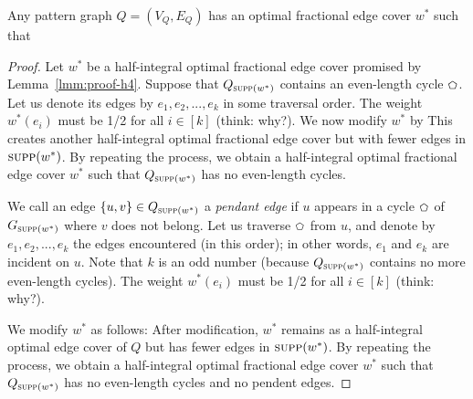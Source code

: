 \begin{lemma} \label{lmm:proof-h5}
   Any pattern graph $Q = (V_Q, E_Q)$ has an optimal fractional edge cover $w^*$ such that
\end{lemma}

\begin{proof}
    Let $w^*$ be a half-integral optimal fractional edge cover promised by Lemma~\ref{lmm:proof-h4}. Suppose that $Q_{\textsc{supp}(w^*)}$ contains an even-length cycle $\mycycle$. Let us denote its edges by $e_1, e_2, ..., e_k$ in some traversal order. The weight $w^*(e_i)$ must be 1/2 for all $i \in [k]$ (think: why?). We now modify $w^*$ by
    This creates another half-integral optimal fractional edge cover but with fewer edges in $\textsc{supp}(w^*)$. By repeating the process, we obtain a half-integral optimal fractional edge cover $w^*$ such that $Q_{\textsc{supp}(w^*)}$ has no even-length cycles.

    \vgap

    We call an edge $\{u,v\} \in Q_{\textsc{supp}(w^*)}$ a {\em pendant edge} if $u$ appears in a cycle $\mycycle$ of $G_{\textsc{supp}(w^*)}$ where $v$ does not belong. Let us traverse $\mycycle$ from $u$, and denote by $e_1, e_2, ..., e_k$ the edges encountered (in this order); in other words, $e_1$ and $e_k$ are incident on $u$. Note that $k$ is an odd number (because $Q_{\textsc{supp}(w^*)}$ contains no more even-length cycles). The weight $w^*(e_i)$ must be 1/2 for all $i \in [k]$ (think: why?).

    \vgap

    We modify $w^*$ as follows:
    After modification, $w^*$ remains as a half-integral optimal edge cover of $Q$ but has fewer edges in $\textsc{supp}(w^*)$. By repeating the process, we obtain a half-integral optimal fractional edge cover $w^*$ such that $Q_{\textsc{supp}(w^*)}$ has no even-length cycles and no pendent edges.


\end{proof}
